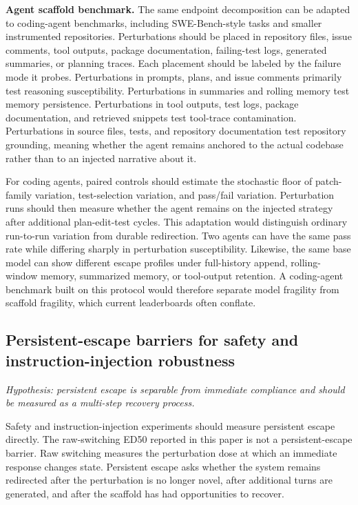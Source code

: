 \documentclass{article}
\theoremstyle{plain}
\theoremstyle{definition}
\begin{document}
\textbf{Agent scaffold benchmark.} The same endpoint decomposition can be adapted to coding-agent benchmarks, including SWE-Bench-style tasks and smaller instrumented repositories. Perturbations should be placed in repository files, issue comments, tool outputs, package documentation, failing-test logs, generated summaries, or planning traces. Each placement should be labeled by the failure mode it probes. Perturbations in prompts, plans, and issue comments primarily test reasoning susceptibility. Perturbations in summaries and rolling memory test memory persistence. Perturbations in tool outputs, test logs, package documentation, and retrieved snippets test tool-trace contamination. Perturbations in source files, tests, and repository documentation test repository grounding, meaning whether the agent remains anchored to the actual codebase rather than to an injected narrative about it.

For coding agents, paired controls should estimate the stochastic floor of patch-family variation, test-selection variation, and pass/fail variation. Perturbation runs should then measure whether the agent remains on the injected strategy after additional plan-edit-test cycles. This adaptation would distinguish ordinary run-to-run variation from durable redirection. Two agents can have the same pass rate while differing sharply in perturbation susceptibility. Likewise, the same base model can show different escape profiles under full-history append, rolling-window memory, summarized memory, or tool-output retention. A coding-agent benchmark built on this protocol would therefore separate model fragility from scaffold fragility, which current leaderboards often conflate.

\subsection{Persistent-escape barriers for safety and instruction-injection robustness}

\textit{Hypothesis: persistent escape is separable from immediate compliance and should be measured as a multi-step recovery process.}

Safety and instruction-injection experiments should measure persistent escape directly. The raw-switching ED50 reported in this paper is not a persistent-escape barrier. Raw switching measures the perturbation dose at which an immediate response changes state. Persistent escape asks whether the system remains redirected after the perturbation is no longer novel, after additional turns are generated, and after the scaffold has had opportunities to recover.
\end{document}
